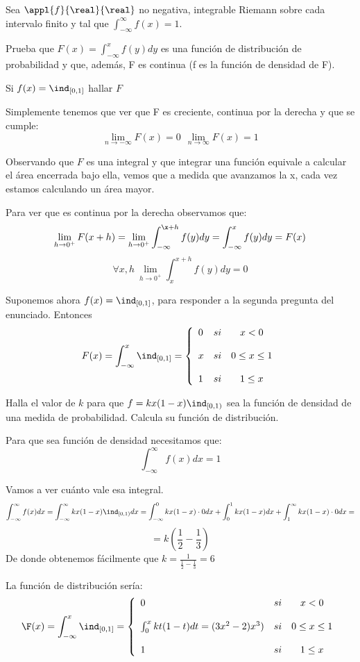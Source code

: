 \begin{problem}
Sea $\appl{f}{\real}{\real}$ no negativa, integrable Riemann sobre cada intervalo finito y tal que $\int_{-\infty}^{\infty}f(x)=1$.

Prueba que $F(x)=\int_{-\infty}^x f(y) dy$ es una función de distribución de probabilidad y que, además, F es continua (f es la función de densidad de F).

Si $f(x)=\ind_{[0,1]}$ hallar $F$

\solution
Simplemente tenemos que ver que F es creciente, continua por la derecha y que se cumple:
\[\lim_{n \to - \infty}F(x)=0 \ \ \lim_{n \to \infty}F(x)=1\]

Observando que $F$ es una integral y que integrar una función equivale a calcular el área encerrada bajo ella, vemos que a medida que avanzamos la x, cada vez estamos calculando un área mayor.

Para ver que es continua por la derecha observamos que:
\[\lim_{h \to 0^+}F(x+h)=\lim_{h \to 0^+} \int_{-\infty}^{\x+h}f(y)dy = \int_{-\infty}^xf(y)dy = F(x)\]
\[\forall x, h \ \lim_{h \to 0^+}\int_{x}^{x+h}f(y)dy=0\]

Suponemos ahora $f(x)=\ind_{[0,1]}$, para responder a la segunda pregunta del enunciado. Entonces
\[F(x)= \int_{-\infty}^{x} \ind_{[0,1]} = \left\{ \begin{array}{lcc}
             0 &   si  & x < 0 \\
             \\ x & si &  0 \leq x \leq 1 \\
             \\ 1 &  si  & 1 \leq x
             \end{array}
   \right.\]
\end{problem}

\begin{problem}
Halla el valor de $k$ para que $f= kx(1-x)\ind_{[0, 1)}$ sea la función de densidad de una medida de probabilidad. Calcula su función de distribución.

\solution
Para que sea función de densidad necesitamos que:
\[\int_{-\infty}^{\infty}f(x) dx = 1\]

Vamos a ver cuánto vale esa integral.
\[\int_{-\infty}^{\infty}f(x) dx = \int_{-\infty}^{\infty}kx(1-x)\ind_{[0, 1)} dx = \int_{-\infty}^{0}kx(1-x)\cdot 0 dx+ \int_{0}^{1}kx(1-x)dx + \int_{1}^{\infty}kx(1-x)\cdot 0 dx = \]
\[= k(\frac{1}{2}-\frac{1}{3})\]
De donde obtenemos fácilmente que $k = \frac{1}{\frac{1}{2}-\frac{1}{3}} = 6$

La función de distribución sería:
\[\F(x)= \int_{-\infty}^{x} \ind_{[0,1]} = \left\{ \begin{array}{lcc}
             0 &   si  & x < 0 \\
             \\ \int_{0}^{x}kt(1-t)dt = (3x^2-2)x^3)& si &  0 \leq x \leq 1 \\
             \\ 1 &  si  & 1 \leq x
             \end{array}
   \right.\]
\end{problem}

